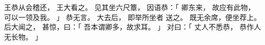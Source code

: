 
\switchcolumn*[\section{}]

王恭从会稽还，
王大看之。
见其坐六尺簟，
因语恭：「
    卿东来，
    故应有此物，
    可以一领及我。
」
恭无言。
大去后，
即举所坐者
送之。
既无余席，便坐荐上。
后大闻之，
甚惊，曰：「
    吾本谓卿多，故求耳。
」
对曰：「
    丈人不悉恭，
    恭作人无长物。
」

\switchcolumn



